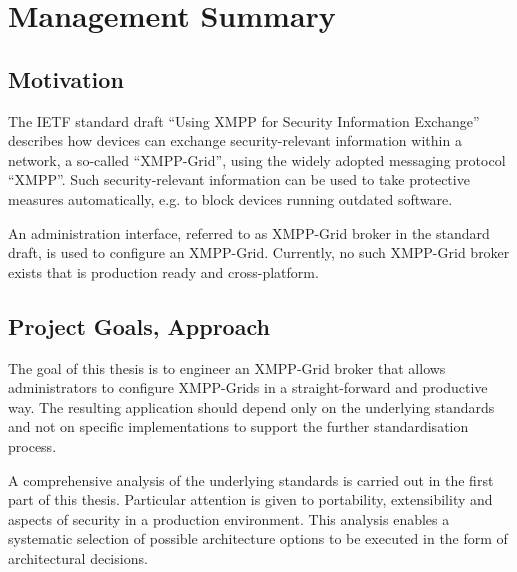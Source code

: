
\chapter{Management Summary}

\section*{Motivation}
The IETF standard draft ``Using XMPP for Security Information Exchange'' describes how devices can exchange security-relevant information within a network, a so-called ``XMPP-Grid'', using the widely adopted messaging protocol ``XMPP''.
Such security-relevant information can be used to take protective measures automatically, e.g. to block devices running outdated software.

An administration interface, referred to as XMPP-Grid broker in the standard draft, is used to configure an XMPP-Grid.
Currently, no such XMPP-Grid broker exists that is production ready and cross-platform.

\section*{Project Goals, Approach}

The goal of this thesis is to engineer an XMPP-Grid broker that allows administrators to configure XMPP-Grids in a straight-forward and productive way.
The resulting application should depend only on the underlying standards and not on specific implementations to support the further standardisation process.

A comprehensive analysis of the underlying standards is carried out in the first part of this thesis.
Particular attention is given to portability, extensibility and aspects of security in a production environment.
This analysis enables a systematic selection of possible architecture options to be executed in the form of architectural decisions.

